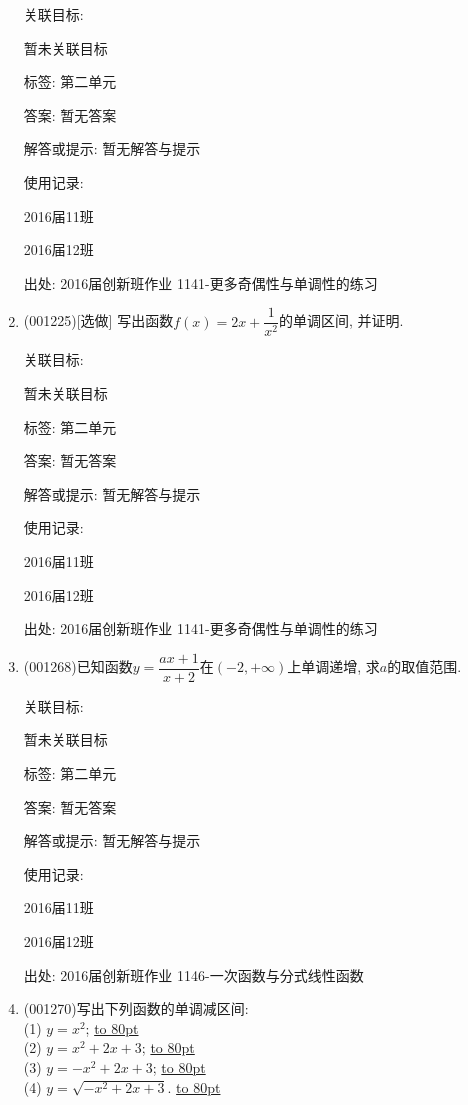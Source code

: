 \documentclass[10pt,a4paper]{article}
\newcommand{\blank}[1]{\underline{\hbox to #1pt{}}}
\begin{document}
\begin{enumerate}[1.]
关联目标:

暂未关联目标



标签: 第二单元

答案: 暂无答案

解答或提示: 暂无解答与提示

使用记录:

2016届11班	

2016届12班	


出处: 2016届创新班作业	1141-更多奇偶性与单调性的练习
\item { (001225)}[选做]
写出函数$f(x)=2x+\dfrac{1}{x^2}$的单调区间, 并证明.


关联目标:

暂未关联目标



标签: 第二单元

答案: 暂无答案

解答或提示: 暂无解答与提示

使用记录:

2016届11班	

2016届12班	


出处: 2016届创新班作业	1141-更多奇偶性与单调性的练习
\item { (001268)}已知函数$y=\dfrac{ax+1}{x+2}$在$(-2,+\infty)$上单调递增, 求$a$的取值范围.


关联目标:

暂未关联目标



标签: 第二单元

答案: 暂无答案

解答或提示: 暂无解答与提示

使用记录:

2016届11班	

2016届12班	


出处: 2016届创新班作业	1146-一次函数与分式线性函数
\item { (001270)}写出下列函数的单调减区间:\\ 
(1) $y=x^2$; \blank{80}\\ 
(2) $y=x^2+2x+3$; \blank{80}\\ 
(3) $y=-x^2+2x+3$; \blank{80}\\ 
(4) $y=\sqrt{-x^2+2x+3}$. \blank{80}



\end{enumerate}
\end{document}
